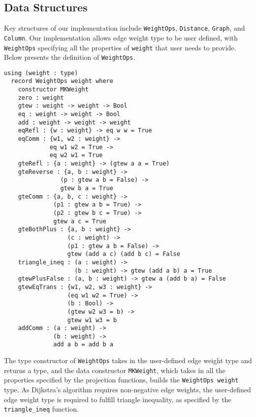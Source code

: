 \subsection{Data Structures}
Key structures of our implementation include \texttt{WeightOps}, \texttt{Distance}, \texttt{Graph}, and \texttt{Column}. Our implementation allows edge weight type to be user defined, with \texttt{WeightOps} specifying all the properties of \texttt{weight} that user needs to provide. Below presents the definition of \texttt{WeightOps}. 
\newline
\begin{lstlisting}
using (weight : type)
  record WeightOps weight where
    constructor MKWeight
    zero : weight
    gtew : weight -> weight -> Bool
    eq : weight -> weight -> Bool
    add : weight -> weight -> weight
    eqRefl : {w : weight} -> eq w w = True
    eqComm : {w1, w2 : weight} -> 
    	     eq w1 w2 = True -> 
    	     eq w2 w1 = True
    gteRefl : {a : weight} -> (gtew a a = True)
    gteReverse : {a, b : weight} -> 
    			(p : gtew a b = False) -> 
    			gtew b a = True
    gteComm : {a, b, c : weight} ->
              (p1 : gtew a b = True) ->
              (p2 : gtew b c = True) ->
              gtew a c = True
    gteBothPlus : {a, b : weight} ->
                  (c : weight) ->
                  (p1 : gtew a b = False) ->
                  gtew (add a c) (add b c) = False
    triangle_ineq : (a : weight) -> 
    				(b : weight) -> gtew (add a b) a = True
    gtewPlusFalse : (a, b : weight) -> gtew a (add b a) = False
    gtewEqTrans : {w1, w2, w3 : weight} -> 
    			  (eq w1 w2 = True) -> 
    			  (b : Bool) -> 
    			  (gtew w2 w3 = b) -> 
    			  gtew w1 w3 = b
    addComm : (a : weight) -> 
    		  (b : weight) -> 
    		  add a b = add b a
\end{lstlisting}
The type constructor of \texttt{WeightOps} takes in the user-defined edge weight type and returns a type, and the data constructor \texttt{MKWeight}, which takes in all the properties specified by the projection functions, builds the \texttt{WeightOps weight} type. As Dijkstra's algorithm requires non-negative edge weights, the user-defined edge weight type is required to fulfill triangle inequality, as specified by the \texttt{triangle\_ineq} function. 
\\

